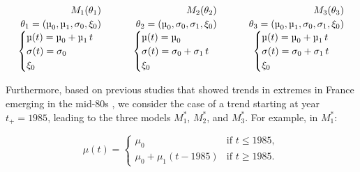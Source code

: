 \documentclass[hess, manuscript]{copernicus}
\begin{document}
\[
\begin{array}{c@{\qquad}c@{\qquad}c}
\begin{array}{c}
\begin{aligned}
M_1(\theta_1)\\[-0.2ex]
\theta_1 = (\mu_0, \mu_1, \sigma_0, \xi_0)
\end{aligned}\\[0.4ex]
\begin{cases}
\mu(t) = \mu_0 + \mu_1\, t \\
\sigma(t) = \sigma_0 \\
\xi_0
\end{cases}
\end{array}
&
\begin{array}{c}
\begin{aligned}
M_2(\theta_2)\\[-0.2ex]
\theta_2 = (\mu_0, \sigma_0, \sigma_1, \xi_0)
\end{aligned}\\[0.4ex]
\begin{cases}
\mu(t) = \mu_0 \\
\sigma(t) = \sigma_0 + \sigma_1\, t \\
\xi_0
\end{cases}
\end{array}
&
\begin{array}{c}
\begin{aligned}
M_3(\theta_3)\\[-0.2ex]
\theta_3 = (\mu_0, \mu_1, \sigma_0, \sigma_1, \xi_0)
\end{aligned}\\[0.4ex]
\begin{cases}
\mu(t) = \mu_0 + \mu_1\, t \\
\sigma(t) = \sigma_0 + \sigma_1\, t \\
\xi_0
\end{cases}
\end{array}
\end{array}
\]


Furthermore, based on previous studies that showed trends in extremes in France emerging in the mid-80s
\citep{Blanchet2018,Ribes2019,blanchet-creutin-2022}, we consider the case of a
trend starting at year $t_{+}=1985$, leading to the three models
$M_{1}^{*}$, $M_{2}^{*}$, and $M_{3}^{*}$. For example, in $M_{1}^{*}$:

\[
\mu(t)=
\begin{cases}
\mu_{0} & \text{if } t \le 1985,\\[4pt]
\mu_{0} + \mu_{1}(t-1985) & \text{if } t \ge 1985.
\end{cases}
\]
\end{document}
